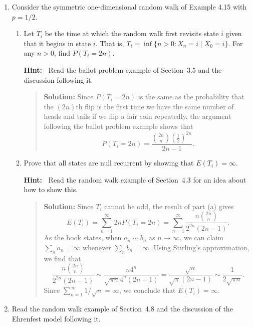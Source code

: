 \documentclass{article}
\begin{document}
\begin{enumerate}
\begin{enumerate}
  \end{enumerate}
  
\item Consider the symmetric one-dimensional random walk of Example 4.15 with
$p=1/2$.

  \begin{enumerate}
  
  \item Let $T_{i}$ be the time at which the random walk first revisits state
  $i$ given that it begins in state $i$. That is, $T_{i} = \inf \{n>0: X_n=i
  \mid X_0=i\}$. For any $n>0$, find $P(T_i=2n)$.
   
  {\bf Hint:\ } Read the ballot problem example of Section~3.5 and the
  discussion following it.
   
  \begin{quotation}{\bf Solution:}
  Since $P(T_i=2n)$ is the same as the probability that the $(2n)$th flip is the first time we have the same number of
  heads and tails if we flip a fair coin repeatedly, the argument following the ballot problem example shows that
  \[
  P(T_i=2n) = \frac{ {{2n}\choose n} \left(\frac12\right)^{2n} }{2n-1}.
  \]
  \end{quotation}

  \item Prove that all states are null recurrent by showing that
  $E(T_i)=\infty$.
   
  {\bf Hint:\ } Read the random walk example of Section~4.3 for an idea about
  how to show this.

  \begin{quotation}{\bf Solution:}
  Since $T_i$ cannot be odd, the result of part (a) gives
  \[
  E(T_i) = \sum_{n=1}^\infty 2n P(T_i=2n) = \sum_{n=1}^\infty \frac{ n {{2n}\choose n}}{2^{2n}(2n-1)}.
  \]
  As the book states, when $a_n\sim b_n$ as $n\to\infty$, we can claim $\sum_na_n=\infty$ whenever $\sum_nb_n=\infty$.
  Using Stirling's approximation, we find that
  \[
  \frac{ n {{2n}\choose n}}{2^{2n}(2n-1)} \sim
  \frac{n4^n}{\sqrt{\pi n} 4^n(2n-1)} = \frac{\sqrt{n} }{\sqrt{\pi} (2n-1)} \sim \frac{ 1}{2\sqrt{\pi n}}.
  \]
  Since $\sum_{n=1}^\infty 1/\sqrt{n}=\infty$, we conclude that $E(T_i)=\infty$.
  \end{quotation}

  \end{enumerate}

\item Read the random walk example of Section~4.8 and the discussion of the
Ehrenfest model following it.


\end{enumerate}
\end{document}
